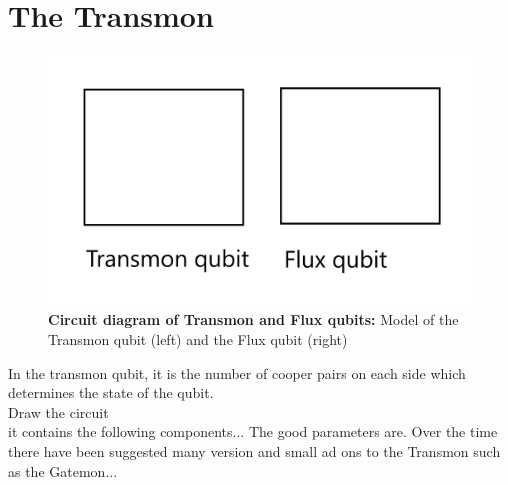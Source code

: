 \section{The Transmon}
    \begin{figure}
        \centering
        \includegraphics[width = 13 cm]{Images/Transmon and flux-qubit.png}
        \caption[Circuit diagram of Transmon and Flux qubits]{\textbf{Circuit diagram of Transmon and Flux qubits:} Model of the Transmon qubit (left) and the Flux qubit (right)}
        \label{Transmon_flux_qubit}
    \end{figure}
    In the transmon qubit, it is the number of cooper pairs on each side which determines the state of the qubit. 
    \\
    Draw the circuit
    \\
    it contains the following components... The good parameters are. Over the time there have been suggested many version and small ad ons to the Transmon such as the Gatemon...

